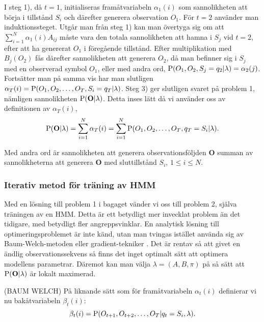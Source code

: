 \documentclass[../rapport_MVEX01-11-05]{subfiles}
\begin{document}
I steg 1), då $t=1$, initialiseras framåtvariabeln $\alpha_1(i)$ som
sannolikheten att börja i tillstånd $S_i$ och därefter generera
observation $O_1$. För $t=2$ använder man induktionssteget. Utgår man
från steg 1) kan man övertyga sig om att
$\sum_{i=1}^N\alpha_1(i)A_{ij}$ måste vara den totala sannolikheten
att hamna i $S_j$ vid $t=2$, efter att ha genererat $O_1$ i föregående
tillstånd. Efter multiplikation med $B_j(O_{2})$ fås därefter
sannolikheten att generera $O_2$, då man befinner sig i $S_j$ med en
observerad symbol $O_1$, eller med andra ord, $\mathrm{P}(O_1,O_2,S_j
= q_2 | \lambda) = \alpha_2(j)$. Fortsätter man på samma vis har man
slutligen $\alpha_T(i) = \mathrm{P}(O_1,O_2,\dots,O_T,S_i = q_T |
\lambda)$. Steg 3) ger slutligen svaret på problem 1, nämligen
sannolikheten $\mathrm{P}(\textbf{O}|\lambda)$. Detta inses lätt då vi
använder oss av definitionen av $\alpha_T(i)$, 
\begin{equation*}
\mathrm{P}(\textbf{O}|\lambda) = \sum_{i=1}^N\alpha_T(i) =
\sum_{i=1}^N\mathrm{P}(O_1,O_2,\dots,O_T,q_T = S_i|\lambda). 
\end{equation*} 

Med andra ord är sannolikheten att generera observationsföljden
$\textbf{O}$ summan av sannolikheterna att generera $\textbf{O}$ med
sluttillstånd $S_i$, $1 \leq i \leq N$.

\subsubsection{Iterativ metod för träning av HMM}

Med en lösning till problem 1 i bagaget vänder vi oss till problem 2,
själva träningen av en HMM. Detta är ett betydligt mer invecklat
problem än det tidigare, med betydligt fler angreppsvinklar. En
analytisk lösning till optimeringsproblemet är inte känd, utan man
tvingas istället använda sig av Baum-Welch-metoden eller
gradient-tekniker \cite{Dempster77,Levinson73}. Det är rentav så att
givet en ändlig observationssekvens så finns det inget optimalt sätt
att optimera modellens parametrar. Däremot kan man välja $\lambda =
(A,B,\pi)$ på så sätt att $\mathrm{P}(\textbf{O}|\lambda)$ är lokalt
maximerad. 


(BAUM WELCH) På liknande sätt som för framåtvariabeln $\alpha_t(i)$
definierar vi nu bakåtvariabeln $\beta_t(i)$: 
\begin{equation*}
\beta_t(i) = \mathrm{P}(O_{t+1},O_{t+2},\dots,O_T | q_t = S_i, \lambda).
\end{equation*} 
\end{document}
